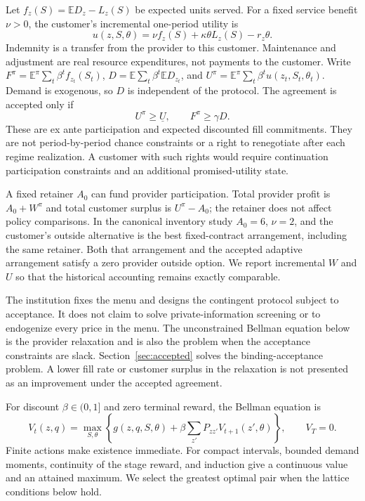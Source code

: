 \documentclass[11pt,letterpaper]{article}
\theoremstyle{definition}
\newcommand{\E}{\mathbb E}
\newcommand{\1}{\mathbf 1}
\begin{document}
Let $f_z(S)=\E D_z-L_z(S)$ be expected units served. For a fixed service benefit $\nu>0$, the customer's incremental one-period utility is
\begin{equation}\label{eq:customer}
 u(z,S,\theta)=\nu f_z(S)+\kappa\theta L_z(S)-r_z\theta.
\end{equation}
Indemnity is a transfer from the provider to this customer. Maintenance and adjustment are real resource expenditures, not payments to the customer. Write $F^\pi=\E^\pi\sum_t\beta^t f_{z_t}(S_t)$, $D=\E\sum_t\beta^t\E D_{z_t}$, and $U^\pi=\E^\pi\sum_t\beta^t u(z_t,S_t,\theta_t)$. Demand is exogenous, so $D$ is independent of the protocol. The agreement is accepted only if
\begin{equation}\label{eq:participation}
 U^\pi\geq\underline U,\qquad F^\pi\geq\gamma D.
\end{equation}
These are ex ante participation and expected discounted fill commitments. They are not period-by-period chance constraints or a right to renegotiate after each regime realization. A customer with such rights would require continuation participation constraints and an additional promised-utility state.

A fixed retainer $A_0$ can fund provider participation. Total provider profit is $A_0+W^\pi$ and total customer surplus is $U^\pi-A_0$; the retainer does not affect policy comparisons. In the canonical inventory study $A_0=6$, $\nu=2$, and the customer's outside alternative is the best fixed-contract arrangement, including the same retainer. Both that arrangement and the accepted adaptive arrangement satisfy a zero provider outside option. We report incremental $W$ and $U$ so that the historical accounting remains exactly comparable.

The institution fixes the menu and designs the contingent protocol subject to acceptance. It does not claim to solve private-information screening or to endogenize every price in the menu. The unconstrained Bellman equation below is the provider relaxation and is also the problem when the acceptance constraints are slack. Section~\ref{sec:accepted} solves the binding-acceptance problem. A lower fill rate or customer surplus in the relaxation is not presented as an improvement under the accepted agreement.

For discount $\beta\in(0,1]$ and zero terminal reward, the Bellman equation is
\begin{equation}\label{eq:bellman}
 V_t(z,q)=\max_{S,\theta}\left\{g(z,q,S,\theta)
       +\beta\sum_{z'}P_{zz'}V_{t+1}(z',\theta)\right\},\qquad V_T=0.
\end{equation}
Finite actions make existence immediate. For compact intervals, bounded demand moments, continuity of the stage reward, and induction give a continuous value and an attained maximum. We select the greatest optimal pair when the lattice conditions below hold.
\end{document}
